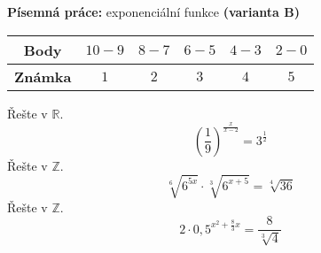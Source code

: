 \begin{center}
\large \textbf{Písemná práce:} exponenciální funkce \textbf{(varianta B)}

\normalsize
{}\qquad
{}\qquad
{}
\end{center}
\begin{table}[h]
\centering
\begin{tabular}{c|c|c|c|c|c}
    \textbf{Body}   & $10-9$ & $8-7$ & $6-5$ & $4-3$ & $2-0$ \\ \hline
    \textbf{Známka} & $1$     & $2$   & $3 $  & $4$   & $5$
\end{tabular}
\end{table}

\noindent
\begin{questions}
    \bracketedpoints
    \question[3] Řešte v $\mathbb{R}$. $$\left(\dfrac{1}{9}\right)^{\frac{x}{x-2}} = 3^{\frac{1}{2}}$$
    \question[3] Řešte v $\mathbb{Z}$. $$\sqrt[6]{6^{5x}} \cdot \sqrt[3]{6^{x+5}} = \sqrt[4]{36}$$
    \question[4] Řešte v $\mathbb{Z}$. $$2\cdot0,5^{x^2+\frac{8}{3}x}=\frac{8}{\sqrt[3]{4}}$$
\end{questions}
\newpage

